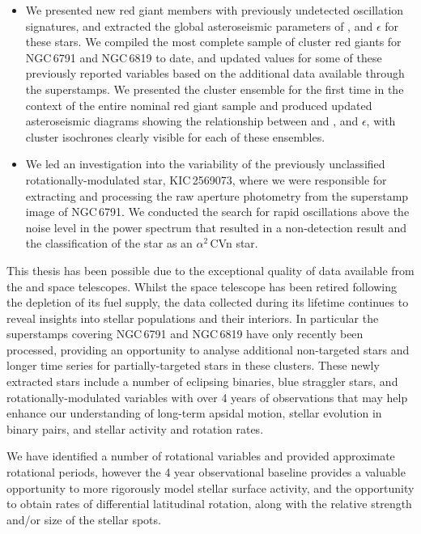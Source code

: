 \begin{itemize}
    \item We presented new red giant members with previously undetected oscillation signatures, and extracted the global asteroseismic parameters of \numax{}, \dnu{} and $\epsilon$ for these stars. We compiled the most complete sample of cluster red giants for NGC\,6791 and NGC\,6819 to date, and updated values for some of these previously reported variables based on the additional data available through the \Kepler{} superstamps. We presented the cluster ensemble for the first time in the context of the entire nominal \Kepler{} red giant sample and produced updated asteroseismic diagrams showing the relationship between \numax{} and \dnu{}, and $\epsilon$, with cluster isochrones clearly visible for each of these ensembles.

    \item We led an investigation into the variability of the previously unclassified rotationally-modulated star, KIC\,2569073, where we were responsible for extracting and processing the raw aperture photometry from the superstamp image of NGC\,6791. We conducted the search for rapid oscillations above the noise level in the power spectrum that resulted in a non-detection result and the classification of the star as an $\alpha^2 $\,CVn star.
\end{itemize}

This thesis has been possible due to the exceptional quality of data available from the \Kepler{} and \Gaia{} space telescopes. Whilst the \Kepler{} space telescope has been retired following the depletion of its fuel supply, the data collected during its lifetime continues to reveal insights into stellar populations and their interiors. In particular the superstamps covering NGC\,6791 and NGC\,6819 have only recently been processed, providing an opportunity to analyse additional non-targeted stars and longer time series for partially-targeted stars in these clusters. These newly extracted stars include a number of eclipsing binaries, blue straggler stars, and rotationally-modulated variables with over 4 years of observations that may help enhance our understanding of long-term apsidal motion, stellar evolution in binary pairs, and stellar activity and rotation rates. 

We have identified a number of rotational variables and provided approximate rotational periods, however the 4 year observational baseline provides a valuable opportunity to more rigorously model stellar surface activity, and the opportunity to obtain rates of differential latitudinal rotation, along with the relative strength and/or size of the stellar spots.

